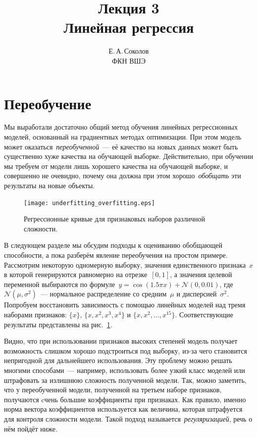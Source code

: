 \documentclass[12pt,fleqn]{article}
\begin{document}
\title{Лекция 3\\Линейная регрессия}
\author{Е.\,А.\,Соколов\\ФКН ВШЭ}
\maketitle

\section{Переобучение}

Мы выработали достаточно общий метод обучения линейных регрессионных моделей,
основанный на градиентных методах оптимизации.
При этом модель может оказаться~\emph{переобученной}~--- её качество
на новых данных может быть существенно хуже качества на обучающей выборке.
Действительно, при обучении мы требуем от модели лишь хорошего качества на обучающей выборке,
и совершенно не очевидно, почему она должна при этом хорошо~\emph{обобщать} эти результаты
на новые объекты.

\begin{figure}[t]
    \centering
    \texttt{[image: underfitting\_overfitting.eps]}
    \caption{Регрессионные кривые для признаковых наборов различной сложности.}
    \label{fig:overfitting}
\end{figure}

В следующем разделе мы обсудим подходы к оцениванию обобщающей способности,
а пока разберём явление переобучения на простом примере.
Рассмотрим некоторую одномерную выборку, значения единственного признака~$x$
в которой генерируются равномерно на отрезке~$[0, 1]$,
а значения целевой переменной выбираются по формуле~$y = \cos(1.5 \pi x) + \mathcal{N}(0, 0.01)$,
где~$\mathcal{N}(\mu, \sigma^2)$~--- нормальное распределение со средним~$\mu$ и дисперсией~$\sigma^2$.
Попробуем восстановить зависимость с помощью линейных моделей над тремя наборами признаков:
$\{x\}$, $\{x, x^2, x^3, x^4\}$ и $\{x, x^2, \dots, x^{15}\}$.
Соответствующие результаты представлены на рис.~\ref{fig:overfitting}.

Видно, что при использовании признаков высоких степеней модель получает возможность
слишком хорошо подстроиться под выборку, из-за чего становится непригодной для дальнейшего использования.
Эту проблему можно решать многими способами~--- например, использовать более узкий класс моделей
или штрафовать за излишнюю сложность полученной модели.
Так, можно заметить, что у переобученной модели, полученной на третьем наборе признаков,
получаются cчень большие коэффициенты при признаках.
Как правило, именно норма вектора коэффициентов используется как величина,
которая штрафуется для контроля сложности модели.
Такой подход называется~\emph{регуляризацией}, речь о нём пойдёт ниже.
\end{document}
